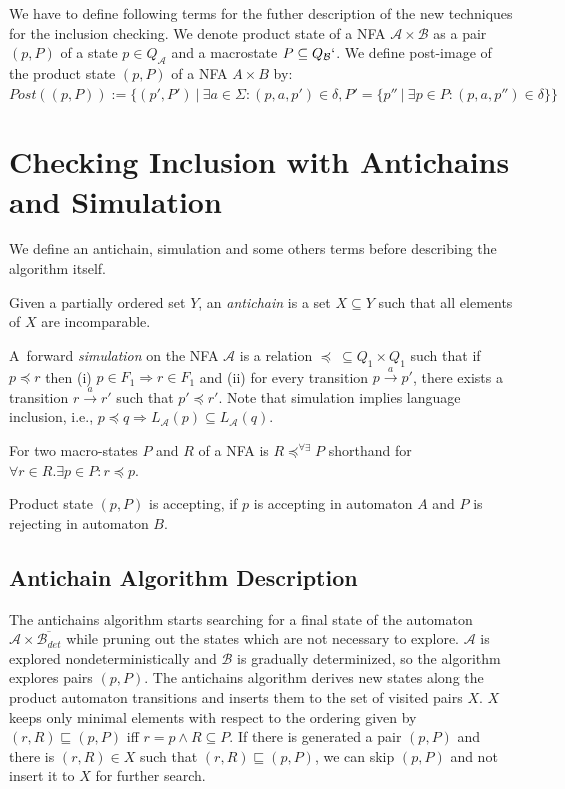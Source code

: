 We have to define following terms for the futher description of the new techniques for the inclusion checking.
We denote product state of a NFA $\mathcal{A} \times \mathcal{B}$ as a pair $(p,P)$ of a state $p\in Q_\mathcal{A}$ and a macrostate $P \subseteq Q_\mathcal{B}`$.
We define post-image of the product state $(p,P)$ of a NFA $A\times B$ by:\
$Post((p,P)):=\{(p',P')\ |\ \exists a \in \Sigma: (p,a,p')\in \delta, P'=\{p''\ |\ \exists p \in P:(p,a,p'')\in \delta\}\}$

\section{Checking Inclusion with Antichains and Simulation}
\label{sectionAntichain}
We define an antichain, simulation and some others terms before describing the algorithm itself.

Given a partially ordered set $Y$, an \emph {antichain} is a set $X \subseteq Y$ such that all elements of $X$ are incomparable.

A~forward \emph{simulation} on the NFA $\mathcal{A}$ is a relation $\preceq\  \subseteq Q_1 \times Q_1$ 
such that if $p \preceq r$ then (i) $p \in F_1 
\Rightarrow r \in F_1$ and (ii) for every transition $p\xrightarrow{a}p'$, there exists a transition 
$r\xrightarrow{a}r'$ such that $p' \preceq r'$. Note that simulation implies language inclusion, i.e., $p\preceq q \Rightarrow L_\mathcal{A}(p)
\subseteq L_\mathcal{A}(q)$.


%
For two macro-states $P$ and $R$ of a NFA is $R\preceq^{\forall\exists}P$ shorthand for $\forall r\in R.\exists p \in P: r \preceq p$.

Product state $(p,P)$ is accepting, if $p$ is accepting in automaton $A$ and $P$ is rejecting in automaton $B$.

\subsection{Antichain Algorithm Description}
The antichains algorithm \cite{cav06} starts searching for a final state of the automaton $\mathcal{A}\times \overline{\mathcal{B}_{det}}$ while
pruning out the states which are not necessary to explore. $\mathcal{A}$ is explored nondeterministically and $\mathcal{B}$ 
is gradually determinized, so the algorithm explores pairs $(p,P)$. 
The antichains algorithm derives new states along the product automaton transitions and inserts them to the set of visited pairs $X$.
$X$ keeps only minimal elements with respect to the ordering given by $(r,R)\sqsubseteq (p,P)$ iff $r=p \wedge R \subseteq P$. 
If there is generated a pair $(p,P)$ and there is 
$(r,R)\in X$ such that $(r,R) \sqsubseteq (p,P)$, we can skip $(p,P)$ and not insert it to $X$ for further search.
 
